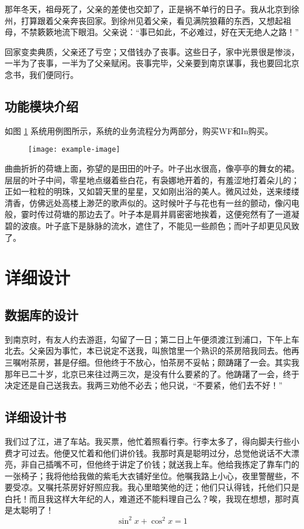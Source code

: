 \documentclass[printMode]{ecnuthesis}
\begin{document}
那年冬天，祖母死了，父亲的差使也交卸了，正是祸不单行的日子。我从北京到徐州，打算跟着父亲奔丧回家。到徐州见着父亲，看见满院狼藉的东西，又想起祖母，不禁簌簌地流下眼泪。父亲说：“事已如此，不必难过，好在天无绝人之路！”

回家变卖典质，父亲还了亏空；又借钱办了丧事。这些日子，家中光景很是惨淡，一半为了丧事，一半为了父亲赋闲。丧事完毕，父亲要到南京谋事，我也要回北京念书，我们便同行。

\section{功能模块介绍}

如图 \ref{fig-2} 系统用例图所示，系统的业务流程分为两部分，购买WF和In购买。
\begin{figure}[htb]
  \centering
  \texttt{[image: example-image]}
  \label{fig-2}
\end{figure}

曲曲折折的荷塘上面，弥望的是田田的叶子。叶子出水很高，像亭亭的舞女的裙。层层的叶子中间，零星地点缀着些白花，有袅娜地开着的，有羞涩地打着朵儿的；正如一粒粒的明珠，又如碧天里的星星，又如刚出浴的美人。微风过处，送来缕缕清香，仿佛远处高楼上渺茫的歌声似的。这时候叶子与花也有一丝的颤动，像闪电般，霎时传过荷塘的那边去了。叶子本是肩并肩密密地挨着，这便宛然有了一道凝碧的波痕。叶子底下是脉脉的流水，遮住了，不能见一些颜色；而叶子却更见风致了。

\chapter{详细设计}

\section{数据库的设计}

到南京时，有友人约去游逛，勾留了一日；第二日上午便须渡江到浦口，下午上车北去。父亲因为事忙，本已说定不送我，叫旅馆里一个熟识的茶房陪我同去。他再三嘱咐茶房，甚是仔细。但他终于不放心，怕茶房不妥帖；颇踌躇了一会。其实我那年已二十岁，北京已来往过两三次，是没有什么要紧的了。他踌躇了一会，终于决定还是自己送我去。我两三劝他不必去；他只说，“不要紧，他们去不好！”

\section{详细设计书}

我们过了江，进了车站。我买票，他忙着照看行李。行李太多了，得向脚夫行些小费才可过去。他便又忙着和他们讲价钱。我那时真是聪明过分，总觉他说话不大漂亮，非自己插嘴不可，但他终于讲定了价钱；就送我上车。他给我拣定了靠车门的一张椅子；我将他给我做的紫毛大衣铺好坐位。他嘱我路上小心，夜里警醒些，不要受凉。又嘱托茶房好好照应我。我心里暗笑他的迂；他们只认得钱，托他们只是白托！而且我这样大年纪的人，难道还不能料理自己么？唉，我现在想想，那时真是太聪明了！
\begin{equation}
  \sin^2 x + \cos^2 x = 1
\end{equation}
\end{document}
